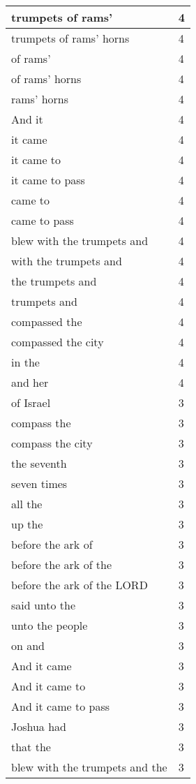 \begin{center}
\begin{longtable}{|p{3.0in}|p{0.5in}|}
trumpets of rams' & 4\\ \hline 
trumpets of rams' horns & 4\\ \hline 
of rams' & 4\\ \hline 
of rams' horns & 4\\ \hline 
rams' horns & 4\\ \hline 
And it & 4\\ \hline 
it came & 4\\ \hline 
it came to & 4\\ \hline 
it came to pass & 4\\ \hline 
came to & 4\\ \hline 
came to pass & 4\\ \hline 
blew with the trumpets and & 4\\ \hline 
with the trumpets and & 4\\ \hline 
the trumpets and & 4\\ \hline 
trumpets and & 4\\ \hline 
compassed the & 4\\ \hline 
compassed the city & 4\\ \hline 
in the & 4\\ \hline 
and her & 4\\ \hline 
of Israel & 3\\ \hline 
compass the & 3\\ \hline 
compass the city & 3\\ \hline 
the seventh & 3\\ \hline 
seven times & 3\\ \hline 
all the & 3\\ \hline 
up the & 3\\ \hline 
before the ark of & 3\\ \hline 
before the ark of the & 3\\ \hline 
before the ark of the LORD & 3\\ \hline 
said unto the & 3\\ \hline 
unto the people & 3\\ \hline 
on and & 3\\ \hline 
And it came & 3\\ \hline 
And it came to & 3\\ \hline 
And it came to pass & 3\\ \hline 
Joshua had & 3\\ \hline 
that the & 3\\ \hline 
blew with the trumpets and the & 3\\ \hline 

\end{longtable}
\end{center}
